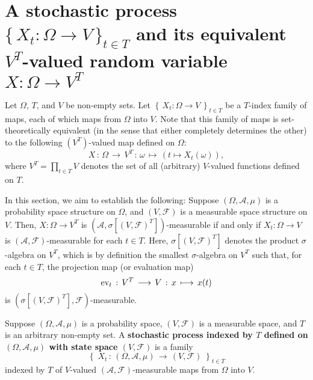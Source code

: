 

\section{A stochastic process $\{\,X_{t} : \Omega \longrightarrow V\,\}_{t\in T}$ and
its equivalent $V^{T}$-valued random variable $X : \Omega \longrightarrow V^{T}$}

\setcounter{theorem}{0}
\setcounter{equation}{0}

Let $\Omega$, $T$, and $V$ be non-empty sets.
Let $\left\{\,X_{t} : \Omega \longrightarrow V \,\right\}_{t \in T}$
be a $T$-index family of maps, each of which maps from $\Omega$ into $V$.
Note that this family of maps is set-theoretically equivalent
(in the sense that either completely determines the other)
to the following $(V^{T})$-valued map defined on $\Omega$:
\begin{equation*}
X \,:\, \Omega \,\longrightarrow\, V^{T} \,:\, \omega \,\longmapsto\, \left(t \longmapsto X_{t}(\omega)\right),
\end{equation*}
where $V^{T} = \prod_{t\in T}V$ denotes the set of all (arbitrary) $V$-valued functions defined on $T$.

In this section, we aim to establish the following:
Suppose $\left(\Omega,\mathcal{A},\mu\right)$ is a probability space structure on $\Omega$,
and $\left(V,\mathcal{F}\right)$ is a measurable space structure on $V$.
Then, $X : \Omega \longrightarrow V^{T}$ is
$\left(\mathcal{A},\sigma[(V,\mathcal{F})^{T}]\right)$-measurable if and only if
$X_{t} : \Omega \longrightarrow V$ is $(\mathcal{A},\mathcal{F})$-measurable for each $t \in T$.
Here, $\sigma[(V,\mathcal{F})^{T}]$ denotes the product $\sigma$-algebra on $V^{T}$,
which is by definition the smallest $\sigma$-algebra on $V^{T}$ such that,
for each $t \in T$, the projection map (or evaluation map)
\begin{equation*}
\textnormal{ev}_{t} \,:\, V^{T} \, \longrightarrow\, V
\,:\, x \,\longmapsto\, x(t)
\end{equation*}
is $\left(\sigma[(V,\mathcal{F})^{T}],\mathcal{F}\right)$-measurable.

\begin{definition}
\mbox{}\vskip 0.1cm
\noindent
Suppose $\left(\Omega,\mathcal{A},\mu\right)$ is a probability space,
$\left(V,\mathcal{F}\right)$ is a measurable space, and 
$T$ is an arbitrary non-empty set.
A
\textbf{stochastic process indexed by $T$ defined on $(\Omega,\mathcal{A},\mu)$
with state space $(V,\mathcal{F})$}
is a family
\begin{equation*}
\left\{\;
X_{t} \,:\, \left(\Omega,\mathcal{A},\mu\right)
\,\longrightarrow\,
\left(V,\mathcal{F}\right)
\;\right\}_{t \in T}
\end{equation*}
indexed by $T$ of $V$-valued $\left(\mathcal{A},\mathcal{F}\right)$-measurable
maps from $\Omega$ into $V$.
\end{definition}

